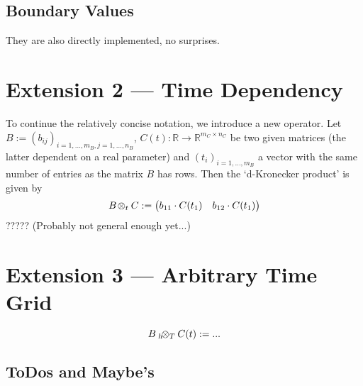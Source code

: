 \documentclass{article}
\newcommand{\defeq}{\mathrel{:=}}%
\newcommand{\kron}{\otimes}%
\newcommand{\dkron}[2][]{\mathbin{{}_{#1}\negthinspace\kron_{#2}}}%
\newcommand{\setR}{\mathbb{R}}%
\begin{document}
%
\subsection*{Boundary Values}
%
They are also directly implemented, no surprises.



%
\newpage

\section*{Extension 2 --- Time Dependency}

To continue the relatively concise notation, we introduce a new operator.
Let $B \defeq (b_{ij})_{i=1,\ldots,m_B, j=1,\ldots,n_B}$, $C(t) %
\colon \setR \to \setR^{m_C \times n_C}$ be two given matrices (the latter dependent on a real parameter) and $(t_i)_{i=1,\ldots, m_B}$ a vector with the same number of entries as the matrix $B$ has rows.
Then the `d-Kronecker product' is given by
\[
B \dkron{t} C \defeq \begin{pmatrix}
 b_{11} \cdot C(t_1) & b_{12}\cdot C(t_1)
\end{pmatrix}
\]
????? (Probably not general enough yet...)

%

\section*{Extension 3 --- Arbitrary Time Grid}

\[
B \dkron[h]{T} C(t) \defeq ...
\]

\appendix

\subsection*{ToDos and Maybe's}
\end{document}
